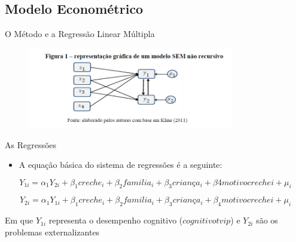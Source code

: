 \documentclass[10pt]{Beamer}
\begin{document}
	\subsection{Modelo Econométrico}

\begin{frame}{O Método e a Regressão Linear Múltipla}
	

\begin{figure}[h]
	\centering
	\includegraphics[width=0.8\textwidth]{SEM}
\end{figure}

\end{frame}

\begin{frame}{As Regressões}	


\begin{block}{}
\begin{itemize}
\item A equação básica do sistema de regressões é a seguinte: 
\end{itemize}
\end{block}


\begin{equation}
Y_{1i} = \alpha_1Y_{2i} + \beta_1creche_i + \beta_2familia_i + \beta_3criança_i + \beta4motivocrechei + \mu_i
\end{equation}

\begin{equation}
Y_{2i} = \alpha_1Y_{1i} + \beta_1creche_i + \beta_2familia_i + \beta_3criança_i + \beta_4motivocrechei + \mu_i
\end{equation}

\begin{tcolorbox}[drop fuzzy shadow=ShadowColor]
Em que $Y_{1i}$ representa o desempenho cognitivo ($cognitivo tvip$) e $Y_{2i}$ são os problemas externalizantes
\end{tcolorbox}

\end{frame}
	
\end{document}
